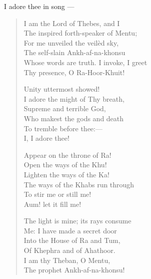 I adore thee in song ---
\begin{center}
\begin{verse}
  I am the Lord of Thebes, and I \\
  \hspace{1em} The inspired forth-speaker of Mentu; \\
  For me unveiled the veil\`{e}d sky, \\
  \hspace{1em} The self-slain Ankh-af-na-khonsu \\
  Whose words are truth. I invoke, I greet \\
  \hspace{1em} Thy presence, O Ra-Hoor-Khuit!

  Unity uttermost showed! \\
  \hspace{1em} I adore the might of Thy breath, \\
  Supreme and terrible God, \\
  \hspace{1em} Who makest the gods and death \\
  To tremble before thee:--- \\
  \hspace{1em} I, I adore thee!

  Appear on the throne of Ra! \\
  \hspace{1em} Open the ways of the Khu! \\
  Lighten the ways of the Ka! \\
  \hspace{1em} The ways of the Khabs run through \\
  To stir me or still me! \\
  \hspace{1em} Aum! let it fill me!

  The light is mine; its rays consume \\
  \hspace{1em} Me: I have made a secret door \\
  Into the House of Ra and Tum, \\
  \hspace{1em} Of Khephra and of Ahathoor. \\
  I am thy Theban, O Mentu, \\
  \hspace{1em} The prophet Ankh-af-na-khonsu!


\end{verse}
\end{center}
